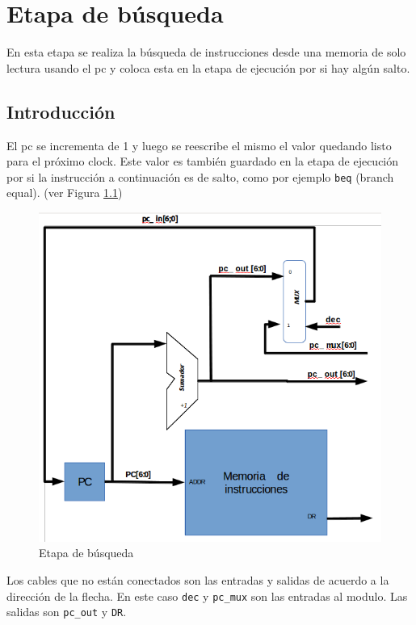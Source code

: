 \chapter{Etapa de búsqueda}
En esta etapa se realiza la búsqueda de instrucciones desde una memoria de solo lectura usando el  \ac{pc} y coloca esta en la etapa de ejecución por si hay algún salto. \cite{bib:Coad}
\section{Introducción}
 El \ac{pc} se incrementa de 1 y luego se reescribe el mismo el valor quedando listo para el próximo clock. Este valor es también guardado en la etapa de ejecución por si la instrucción a continuación es de salto, como por ejemplo \texttt{beq} (branch equal). (ver Figura \ref{fig:fetch})
 
\begin{figure}[H]
\centering
\includegraphics[scale=0.35]{Capitulo01/fetch}
\caption{Etapa de búsqueda}
\label{fig:fetch}
\end{figure}

Los cables que no están conectados son las entradas y salidas de acuerdo a la dirección de la flecha. En este caso \texttt{dec} y \texttt{pc\_mux} son las entradas al modulo. Las salidas son \texttt{pc\_out} y \texttt{DR}.

